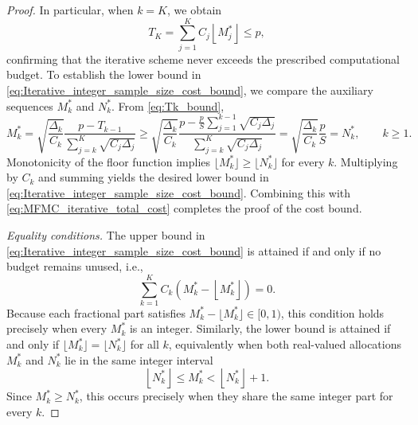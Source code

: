\begin{proof}
In particular, when $k=K$, we obtain
\begin{equation}\label{eq:MFMC_iterative_total_cost}
T_K = \sum_{j=1}^K C_j\left\lfloor M_j^*\right\rfloor \le p,
\end{equation}
confirming that the iterative scheme never exceeds the prescribed computational budget. To establish the lower bound in \eqref{eq:Iterative_integer_sample_size_cost_bound}, we compare the auxiliary sequences $M_k^*$ and $N_k^*$. From \eqref{eq:Tk_bound},
%
\[
M_k^* = \sqrt{\frac{\Delta_k}{C_k}}\frac{p - T_{k-1}}{\sum_{j=k}^K\sqrt{C_j\Delta_j}} \ge \sqrt{\frac{\Delta_k}{C_k}}\frac{p-\frac{p}{S}\sum_{j=1}^{k-1}\sqrt{C_j\Delta_j}}{\sum_{j=k}^K\sqrt{C_j\Delta_j}} = \sqrt{\frac{\Delta_k}{C_k}}\frac{p}{S}=N_k^*, \qquad k \ge 1.
\]
% 
Monotonicity of the floor function implies \(\lfloor M_k^*\rfloor\ge\lfloor N_k^*\rfloor\) for every \(k\). Multiplying by \(C_k\) and summing yields the desired lower bound in 
\eqref{eq:Iterative_integer_sample_size_cost_bound}.  
Combining this with \eqref{eq:MFMC_iterative_total_cost} completes the proof of the cost bound.


\medskip
\noindent
\textit{ Equality conditions.}
The upper bound in \eqref{eq:Iterative_integer_sample_size_cost_bound} is attained if and only if no budget remains unused, i.e.,
\[
\sum_{k=1}^K C_k \left(M_k^* - \left\lfloor M_k^*\right\rfloor\right) = 0.
\]
Because each fractional part satisfies $M_k^* - \lfloor M_k^* \rfloor \in [0,1)$, this condition holds precisely when every $M_k^*$ is an integer. Similarly, the lower bound is attained if and only if \(\lfloor M_k^* \rfloor = \lfloor N_k^* \rfloor\) for all \(k\), equivalently when both real-valued allocations \(M_k^*\) and \(N_k^*\) lie in the same integer interval
%
\[
\left\lfloor N_k^*\right\rfloor\le M_k^* < \left\lfloor N_k^*\right\rfloor + 1.
\]
Since \(M_k^* \ge N_k^*\), this occurs precisely when they share the same integer part for every \(k\).

\end{proof}


